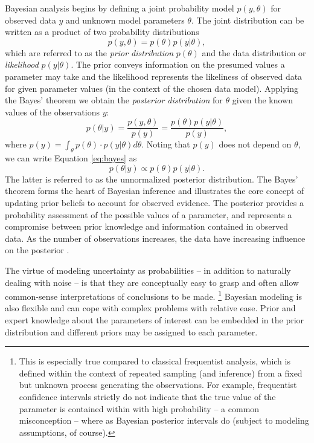 Bayesian analysis begins by defining a joint probability model $p(y,\theta)$
for observed data $y$ and unknown model parameters $\theta$.
The joint distribution can be written as a product of two probability distributions
\begin{equation}
  p(y,\theta) = p(\theta) p(y|\theta),
\end{equation}
which are referred to as the \emph{prior distribution} $p(\theta)$ and the
data distribution or \emph{likelihood} $p(y|\theta)$. The prior conveys
information on the presumed values a parameter may take and the likelihood
represents the likeliness of observed data for given parameter values (in the
context of the chosen data model). Applying the Bayes' theorem we obtain the
\emph{posterior distribution} for $\theta$ given the known values of the
observations $y$:
\begin{equation}
  \label{eq:bayes}
  p(\theta|y) = \frac{p(y,\theta)}{p(y)} = \frac{p(\theta) p(y|\theta)}{p(y)},
\end{equation}
where $p(y) = \int_{\theta} p(\theta) \cdot p(y|\theta) d\theta$.
Noting that $p(y)$ does not depend on $\theta$, we can write Equation
\ref{eq:bayes} as
\begin{equation}
  p(\theta|y) \propto p(\theta) p(y|\theta).
\end{equation}
The latter is referred to as the unnormalized posterior distribution. The
Bayes' theorem forms the heart of Bayesian inference and illustrates the core
concept of updating prior beliefs to account for observed evidence. The
posterior provides a probability assessment of the possible values of 
a parameter, and represents a compromise between prior knowledge and information
contained in observed data. As the number of observations increases, the
data have increasing influence on the posterior \citep{Gelman2013}.

The virtue of modeling uncertainty as probabilities -- in addition to
naturally dealing with noise -- is that they are conceptually easy to grasp
and often allow common-sense interpretations of conclusions to be made.
\footnote{This is especially true compared to classical frequentist analysis,
which is defined within the context of repeated sampling (and inference) from
a fixed but unknown process generating the observations. For
example, frequentist confidence intervals strictly do not indicate that the
true value of the parameter is contained within with high probability -- a
common misconception -- where as Bayesian posterior intervals do (subject to
modeling assumptions, of course).}
Bayesian modeling is also flexible and can cope with complex problems with
relative ease. Prior and expert knowledge about the parameters of interest can be
embedded in the prior distribution and different priors may be assigned to
each parameter.

